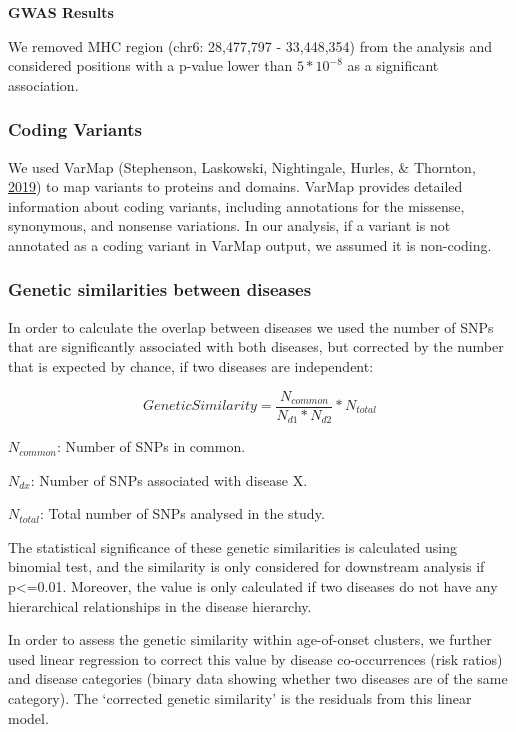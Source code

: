 \documentclass[12pt,twoside]{unicam}
\begin{document}
\textbf{GWAS Results}

We removed MHC region (chr6: 28,477,797 - 33,448,354) from the analysis and considered positions with a p-value lower than \(5*10^{-8}\) as a significant association.

\hypertarget{coding-variants}{%
\subsubsection{Coding Variants}\label{coding-variants}}

We used VarMap (Stephenson, Laskowski, Nightingale, Hurles, \& Thornton, \protect\hyperlink{ref-Stephenson2019}{2019}) to map variants to proteins and domains. VarMap provides detailed information about coding variants, including annotations for the missense, synonymous, and nonsense variations. In our analysis, if a variant is not annotated as a coding variant in VarMap output, we assumed it is non-coding.

\hypertarget{genetic-similarities-between-diseases-1}{%
\subsubsection{Genetic similarities between diseases}\label{genetic-similarities-between-diseases-1}}

In order to calculate the overlap between diseases we used the number of SNPs that are significantly associated with both diseases, but corrected by the number that is expected by chance, if two diseases are independent:

\begin{equation}
    Genetic Similarity = \dfrac{N_{common}}{N_{d1}*N_{d2}}*N_{total}
  \label{eq:disgensim}
\end{equation}

\(N_{common}\): Number of SNPs in common.

\(N_{dx}\): Number of SNPs associated with disease X.

\(N_{total}\): Total number of SNPs analysed in the study.

The statistical significance of these genetic similarities is calculated using binomial test, and the similarity is only considered for downstream analysis if p\textless=0.01. Moreover, the value is only calculated if two diseases do not have any hierarchical relationships in the disease hierarchy.

In order to assess the genetic similarity within age-of-onset clusters, we further used linear regression to correct this value by disease co-occurrences (risk ratios) and disease categories (binary data showing whether two diseases are of the same category). The `corrected genetic similarity' is the residuals from this linear model.
\end{document}
